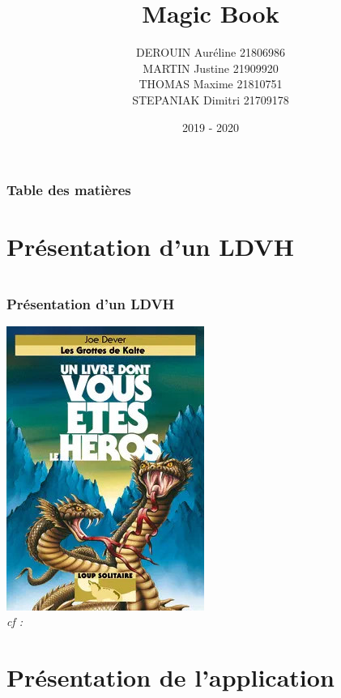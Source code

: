 \documentclass[beamer]{BetterDocument}
\title{Magic Book}
\author{DEROUIN Auréline 21806986\\
	MARTIN Justine 21909920 \\
	THOMAS Maxime 21810751 \\
	STEPANIAK Dimitri 21709178}
\institute{UniCaen}
\date{2019 - 2020}
\begin{document}
	\frame{\titlepage}

	\begin{frame}
		\frametitle{Table des matières}

		\tableofcontents
	\end{frame}

	\section{Présentation d'un LDVH}
	\section{}
	\begin{frame}
		\frametitle{Présentation d'un LDVH}

		\center\includegraphics[height=0.4\paperheight, keepaspectratio]{img/ldvh1.jpg}\\
		\textit{cf : \cite{book:loupSolitaire}}
	\end{frame}

	\section{Présentation de l'application}
\end{document}
